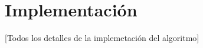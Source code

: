 \chapter{Implementaci\'on}\label{chapter:CODE}

[Todos los detalles de la implemetaci\'on del algoritmo]